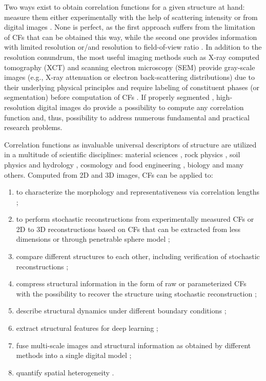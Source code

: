 \documentclass[reprint,amsmath,amssymb,aps,pre,showkeys,showpacs,nofootinbib]{revtex4-1}
\begin{document}
Two ways exist to obtain correlation functions for a given structure at hand:
measure them either experimentally with the help of scattering intensity
\cite{debye1957scattering,li2018direct} or from digital images
\cite{berryman1985measurement,ma2018SS}. None is perfect, as the first approach
suffers from the limitation of CFs that can be obtained this way, while the
second one provides information with limited resolution or/and resolution to
field-of-view ratio \cite{gerke2015universal}. In addition to the resolution
conundrum, the most useful imaging methods such as X-ray computed tomography
(XCT) and scanning electron microscopy (SEM) provide gray-scale images (e.g.,
X-ray attenuation or electron back-scattering distributions) due to their
underlying physical principles and require labeling of constituent phases (or
segmentation) before computation of CFs \cite{samarin2023robust}. If properly
segmented \cite{NNseg}, high-resolution digital images do provide a possibility
to compute any correlation function and, thus, possibility to address numerous
fundamental and practical research problems.

Correlation functions as invaluable universal descriptors of structure are
utilized in a multitude of scientific disciplines: material sciences
\cite{hasanabadi20163d,Havelka,feng2018reconstruction,chen2022quantifying}, rock
physics \cite{ledesma2018effect}, soil physics and hydrology
\cite{PLoS_ONE,KarsaninaEJSS}, cosmology and food engineering
\cite{TakadaJain,Derossi2019}, biology \cite{veatch2012correlation} and many
others. Computed from 2D and 3D images, CFs can be applied to:
\begin{enumerate}
  \item to characterize the morphology and representativeness via correlation
    lengths \cite{vcapek2009stochastic,thovert2011grain,tensorPRE};
  \item to perform stochastic reconstructions from experimentally measured CFs
    or 2D to 3D reconstructions based on CFs that can be extracted from less
    dimensions or through penetrable sphere model
    \cite{Adler_recon,Y-T,tahmasebiPRL,hasanabadi20163d,karsaninaPRL};
  \item compare different structures to each other, including verification of
    stochastic reconstructions \cite{vcapek2009stochastic,tahmasebiPRL,EPL2};
  \item compress structural information in the form of raw or parameterized CFs
    with the possibility to recover the structure using stochastic
    reconstruction \cite{SciRep1,Havelka,KarsaninaEJSS};
  \item describe structural dynamics under different boundary conditions
    \cite{chen2015dynamic,xu2022correlation,fomin2023soil};
  \item extract structural features for deep learning
    \cite{pilania2017multi,kamrava2020linking,roding2020predicting,KarsaninaEJSS};
  \item fuse multi-scale images and structural information as obtained by
    different methods into a single digital model \cite{Geoderma2018};
  \item quantify spatial heterogeneity \cite{zhang2000pore,REVpaper}.
\end{enumerate}
\end{document}
